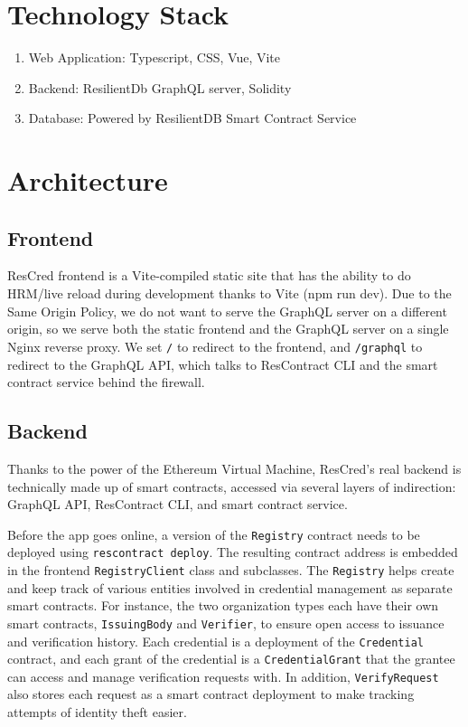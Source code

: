 \section{Technology Stack}
\begin{enumerate}
    \item Web Application: Typescript, CSS, Vue, Vite 
    \item Backend: ResilientDb GraphQL server, Solidity
    \item Database: Powered by ResilientDB Smart Contract Service
\end{enumerate}

\section{Architecture}

\subsection{Frontend}

ResCred frontend is a Vite-compiled static site that has the ability to do HRM/live reload during development thanks to Vite (npm run dev). Due to the Same Origin Policy, we do not want to serve the GraphQL server on a different origin, so we serve both the static frontend and the GraphQL server on a single Nginx reverse proxy. 
We set \verb|/| to redirect to the frontend, and \verb|/graphql| to redirect to the GraphQL API,
which talks to ResContract CLI and the smart contract service behind the firewall.

\subsection{Backend}

Thanks to the power of the Ethereum Virtual Machine, ResCred’s real backend is technically made up of smart contracts, accessed via several layers of indirection: GraphQL API, ResContract CLI, and smart contract service.

Before the app goes online, a version of the \verb|Registry| contract needs to be deployed using
\verb|rescontract deploy|. The resulting contract address is embedded in the frontend
\verb|RegistryClient| class and subclasses. The \verb|Registry| helps create and keep track of
various entities involved in credential management as separate smart contracts. For instance, the
two organization types each have their own smart contracts, \verb|IssuingBody| and \verb|Verifier|,
to ensure open access to issuance and verification history. Each credential is a deployment of the
\verb|Credential| contract, and each grant of the credential is a \verb|CredentialGrant| that the
grantee can access and manage verification requests with. In addition, \verb|VerifyRequest| also stores each request as a smart contract deployment to make tracking attempts of identity theft easier.


